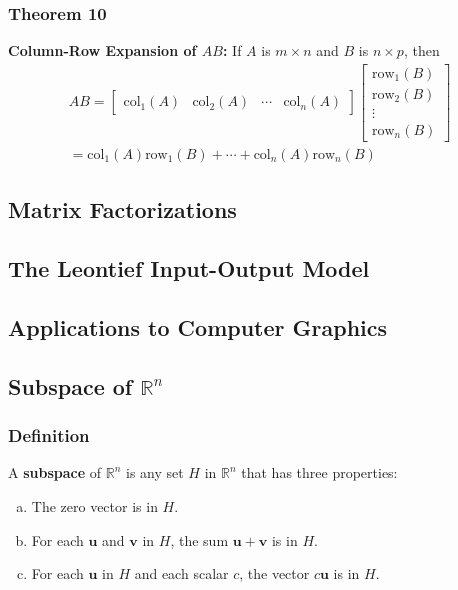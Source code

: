 \documentclass[letterpaper,11pt]{article}
\begin{document}
			\subsubsection{Theorem 10}
				\textbf{Column-Row Expansion of $AB$:} If $A$ is $m\times n$ and $B$ is $n\times p$, then
				\begin{eqnarray}
					AB=\begin{bmatrix}
						\textrm{col}_1(A) & \textrm{col}_2(A) & \cdots & \textrm{col}_n(A)
					\end{bmatrix}
					\begin{bmatrix}
						\textrm{row}_1(B) \\ \textrm{row}_2(B) \\ \vdots \\ \textrm{row}_n(B)
					\end{bmatrix}\\
					=\textrm{col}_1(A)\textrm{row}_1(B)+\cdots +\textrm{col}_n(A)\textrm{row}_n(B)
				\end{eqnarray}
		\subsection{Matrix Factorizations}
		\subsection{The Leontief Input-Output Model}
		\subsection{Applications to Computer Graphics}
		\subsection{Subspace of $\mathbb{R}^n$}
			\subsubsection{Definition}
				A \textbf{subspace} of $\mathbb{R}^n$ is any set $H$ in $\mathbb{R}^n$ that has three properties:
				\begin{enumerate}[a.]
					\item The zero vector is in $H$.
					\item For each $\mathbf{u}$ and $\mathbf{v}$ in $H$, the sum $\mathbf{u}+\mathbf{v}$ is in $H$.
					\item For each $\mathbf{u}$ in $H$ and each scalar $c$, the vector $c\mathbf{u}$ is in $H$.
				\end{enumerate}
\end{document}
